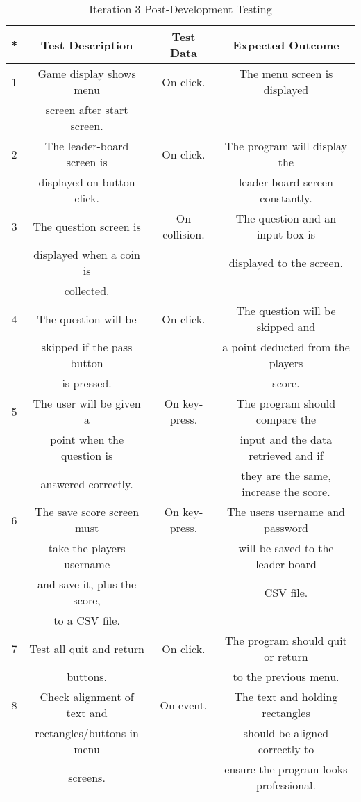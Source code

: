 \documentclass[12pt]{report}
\begin{document}
\begin{table}[H]
    \centering
    \begin{tabular}{|c|c|c|c|}
    \hline
    \textbf{*} & \textbf{Test Description} & \textbf{Test Data} & \textbf{Expected Outcome}\\
    \hline
    1 & Game display shows menu & On click. & The menu screen is displayed \\
    & screen after start screen. & &\\
    \hline
    2 & The leader-board screen is & On click. & The program will display the\\
      & displayed on button click. & & leader-board screen constantly. \\
    \hline
    3 & The question screen is & On collision. & The question and an input box is\\
    & displayed when a coin is & & displayed to the screen. \\
    & collected. & &\\
    \hline
    4 & The question will be & On click. & The question will be skipped and\\
    & skipped if the pass button & &a point deducted from the players  \\
    & is pressed. & & score.\\
    \hline
    5 & The user will be given a & On key-press. & The program should compare the \\
    & point when the question is & & input and the data retrieved and if\\
    & answered correctly. & & they are the same, increase the score. \\
    \hline
    6 & The save score screen must & On key-press. & The users username and password\\
    & take the players username  & & will be saved to the leader-board\\
    & and save it, plus the score, & & CSV file.\\
    & to a CSV file. & & \\
    \hline
    7 & Test all quit and return & On click. & The program should quit or return\\
    & buttons. & & to the previous menu.\\
    \hline
    8 & Check alignment of text and & On event. & The text and holding rectangles \\
      & rectangles/buttons in menu & & should be aligned correctly to \\
      & screens. & & ensure the program looks professional.  \\
    \hline
    \end{tabular}
    \caption{Iteration 3 Post-Development Testing}
    \label{TestTable}
\end{table}
\end{document}
